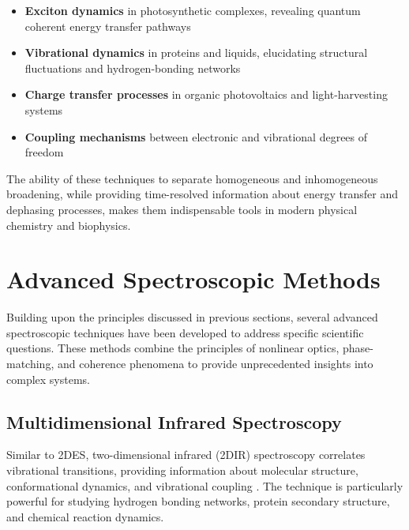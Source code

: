 \begin{itemize}
	\item \textbf{Exciton dynamics} in photosynthetic complexes, revealing quantum coherent energy transfer pathways %
	\item \textbf{Vibrational dynamics} in proteins and liquids, elucidating structural fluctuations and hydrogen-bonding networks \cite{hammzanni2011conceptsmethods2d}
	\item \textbf{Charge transfer processes} in organic photovoltaics and light-harvesting systems
	\item \textbf{Coupling mechanisms} between electronic and vibrational degrees of freedom \cite{khaliletal2004vibrationalcoherencetransfer}
\end{itemize}

\noindent The ability of these techniques to separate homogeneous and inhomogeneous broadening, while providing time-resolved information about energy transfer and dephasing processes, makes them indispensable tools in modern physical chemistry and biophysics.


\section{Advanced Spectroscopic Methods}
\label{sec:advanced_methods}

\noindent Building upon the principles discussed in previous sections, several advanced spectroscopic techniques have been developed to address specific scientific questions. These methods combine the principles of nonlinear optics, phase-matching, and coherence phenomena to provide unprecedented insights into complex systems.

\subsection{Multidimensional Infrared Spectroscopy}
\label{subsec:2dir}

\noindent Similar to 2DES, two-dimensional infrared (2DIR) spectroscopy correlates vibrational transitions, providing information about molecular structure, conformational dynamics, and vibrational coupling \cite{hammzanni2011conceptsmethods2d, khaliletal2004vibrationalcoherencetransfer}. The technique is particularly powerful for studying hydrogen bonding networks, protein secondary structure, and chemical reaction dynamics.

